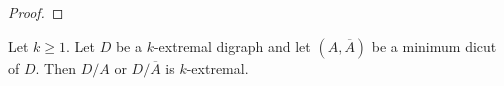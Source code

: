 \begin{proof}
    
    
    
    
    

    
\end{proof}

\begin{lemma}\label{lem:contraction_extremal}
    Let $k \geq 1$. Let $D$ be a $k$-extremal digraph and let $(A,\overline{A})$ be a minimum dicut of 
    $D$. Then $D/A$ or $D/\overline{A}$ is $k$-extremal.
\end{lemma}

